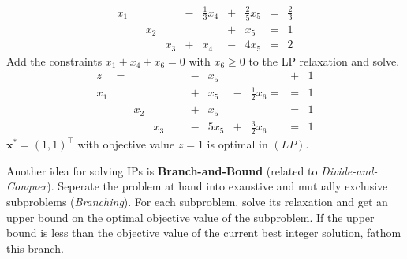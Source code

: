 \begin{exbox}
\begin{example}
\[\begin{array}{cccccccccc}
                x_1 &   &     &     & - & \frac{1}{3} x_4 & + & \frac{2}{5} x_5 & = & \frac{2}{3} \\
                    &   & x_2 &     &   &                 & + & x_5             & = & 1           \\
                    &   &     & x_3 & + & x_4             & - & 4x_5            & = & 2
            \end{array}
        \]
        Add the constraints $ x_1+x_4+x_6=0 $ with $ x_6\geqslant 0 $ to the LP relaxation and solve.
        \[
            \begin{array}{cccccccccccc}
                z   & = &     &     &  &  & - & x_5  &   &                   & + & 1 \\
                x_1 &   &     &     &  &  & + & x_5  & - & \frac{1}{2} x_6 = & = & 1 \\
                    &   & x_2 &     &  &  & + & x_5  &   &                   & = & 1 \\
                    &   &     & x_3 &  &  & - & 5x_5 & + & \frac{3}{2} x_6   & = & 1
            \end{array}
        \]
        $ \bm{x}^*=(1,1)^\top $ with objective value $ z=1 $ is optimal in $ (LP) $.
    \end{example}
\end{exbox}

Another idea for solving IPs is \textbf{Branch-and-Bound} (related to \emph{Divide-and-Conquer}).
Seperate the problem at hand into exaustive and mutually exclusive subproblems (\emph{Branching}).
For each subproblem, solve its relaxation and get an upper bound on the optimal objective
value of the subproblem. If the upper bound is less than the objective value of the current
best integer solution, fathom this branch.